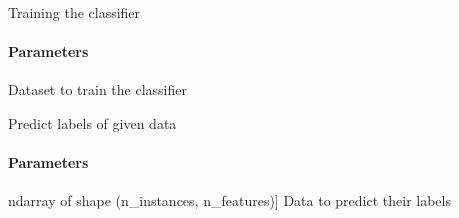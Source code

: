 \documentclass[letterpaper,10pt,english]{sphinxmanual}
\begin{document}
\begin{fulllineitems}
\begin{fulllineitems}
\label{\detokenize{classifier/mimlTOmi/_autosummary/miml.classifier.mimlTOmi.miml_to_mi_lp_classifier.MIMLtoMILPClassifier:miml.classifier.mimlTOmi.miml_to_mi_lp_classifier.MIMLtoMILPClassifier.fit_internal}}
\pysigstartsignatures
{}
\pysigstopsignatures
\sphinxAtStartPar
Training the classifier


\paragraph{Parameters}
\label{\detokenize{classifier/mimlTOmi/_autosummary/miml.classifier.mimlTOmi.miml_to_mi_lp_classifier.MIMLtoMILPClassifier:id2}}\begin{description}
\sphinxAtStartPar
Dataset to train the classifier

\end{description}

\end{fulllineitems}


\begin{fulllineitems}
\label{\detokenize{classifier/mimlTOmi/_autosummary/miml.classifier.mimlTOmi.miml_to_mi_lp_classifier.MIMLtoMILPClassifier:miml.classifier.mimlTOmi.miml_to_mi_lp_classifier.MIMLtoMILPClassifier.predict}}
\pysigstartsignatures
{}
\pysigstopsignatures
\sphinxAtStartPar
Predict labels of given data


\paragraph{Parameters}
\label{\detokenize{classifier/mimlTOmi/_autosummary/miml.classifier.mimlTOmi.miml_to_mi_lp_classifier.MIMLtoMILPClassifier:id3}}\begin{description}
\sphinxlineitem{x}{[}ndarray of shape (n\_instances, n\_features){]}
\sphinxAtStartPar
Data to predict their labels


\end{description}
\end{fulllineitems}
\end{fulllineitems}
\end{document}
